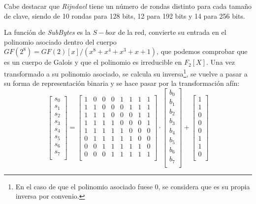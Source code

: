 Cabe destacar que \textit{Rijndael} tiene un número de rondas distinto para cada tamaño de clave, siendo de 10 rondas para 128 bits, 12 para 192 bits y 14 para 256 bits\cite{Rijndael_specs}.

La función de \textit{SubBytes} es la $S-box$ de la red, convierte su entrada en el polinomio asociado dentro del cuerpo $\textit{GF}(2^8) = \textit{GF}(2)[x]/(x^8+x^4+x^3+x+1)$, que podemos comprobar que es un cuerpo de Galois y que el polinomio es irreducible en $F_2[X]$. Una vez transformado a su polinomio asociado, se calcula su inversa\footnote{En el caso de que el polinomio asociado fuese 0, se considera que es su propia inversa por convenio.}, se vuelve a pasar a su forma de representación binaria y se hace pasar por la transformación afín:
$$\begin{bmatrix}
    s_0 \\
    s_1 \\
    s_2 \\
    s_3 \\
    s_4 \\
    s_5 \\
    s_6 \\
    s_7 \\
\end{bmatrix} =
\begin{bmatrix}
    1 & 0 & 0 & 0 & 1 & 1 & 1 & 1 \\
    1 & 1 & 0 & 0 & 0 & 1 & 1 & 1 \\
    1 & 1 & 1 & 0 & 0 & 0 & 1 & 1 \\
    1 & 1 & 1 & 1 & 0 & 0 & 0 & 1 \\
    1 & 1 & 1 & 1 & 1 & 0 & 0 & 0 \\
    0 & 1 & 1 & 1 & 1 & 1 & 0 & 0 \\
    0 & 0 & 1 & 1 & 1 & 1 & 1 & 0 \\
    0 & 0 & 0 & 1 & 1 & 1 & 1 & 1 \\
\end{bmatrix} \cdot
\begin{bmatrix}
    b_0 \\
    b_1 \\
    b_2 \\
    b_3 \\
    b_4 \\
    b_5 \\
    b_6 \\
    b_7 \\
\end{bmatrix} +
\begin{bmatrix}
    1 \\
    1 \\
    0 \\
    0 \\
    0 \\
    1 \\
    1 \\
    0 \\
\end{bmatrix}$$

